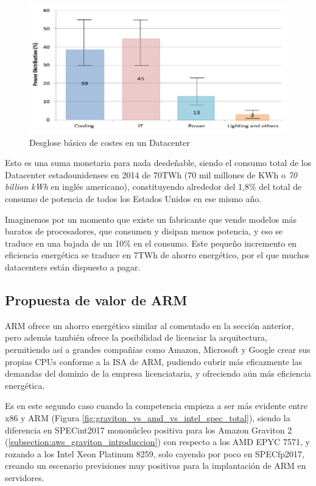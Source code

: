\documentclass[a4paper,openright,12pt]{article}
\begin{document}
\begin{figure}[h]
\includegraphics[width=\textwidth]{img/data_center_power_consumption.png}
\caption{Desglose básico de costes en un Datacenter\\\parencite{datacenter_energy_cost_SONG20151255}}
\label{fig:datacenter_energy_cost}
\end{figure}

Esto es una suma monetaria para nada desdeñable, siendo el consumo total de los Datacenter estadounidenses en 2014 de 70TWh (70 mil millones de KWh o \emph{70 billion kWh} en inglés americano),
constituyendo alrededor del 1,8\% del total de consumo de potencia de todos los Estados Unidos en ese mismo año. \autocite[7]{usa_datacenter_energy_usage_report_61109}

Imaginemos por un momento que existe un fabricante que vende modelos más baratos de procesadores, que consumen y disipan menos potencia, y eso se traduce en una bajada de un 10\% en el consumo.
Este pequeño incremento en eficiencia energética se traduce en 7TWh de ahorro energético, por el que muchos datacenters están dispuesto a pagar.

\subsection{Propuesta de valor de ARM}\label{subsection:propuesta_valor_arm}
ARM ofrece un ahorro energético similar al comentado en la sección anterior, pero además también ofrece la posibilidad de licenciar la arquitectura, permitiendo así a grandes compañías
como Amazon, Microsoft y Google crear sus propias CPUs conforme a la \gls{ISA} de ARM, pudiendo cubrir más eficazmente las demandas del dominio de la empresa licenciataria, y ofreciendo aún más
eficiencia energética.

Es en este segundo caso cuando la competencia empieza a ser más evidente entre \gls{x86} y ARM (Figura \ref{fig:graviton_vs_amd_vs_intel_spec_total}), siendo la diferencia en SPECint2017 mononúcleo
positiva para los Amazon Graviton 2 (\ref{subsection:aws_graviton_introduccion}) con respecto
a los AMD EPYC 7571, y rozando a los Intel Xeon Platinum 8259, solo cayendo por poco en SPECfp2017, creando un escenario previsiones muy positivas para la implantación de ARM
en servidores. \parencite{graviton2_vs_amd_vs_intel_cloud_compute}
\end{document}
